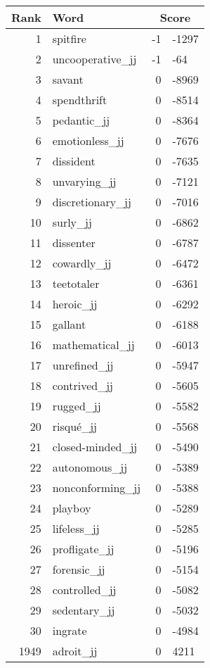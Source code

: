 \begin{longtable}[!htbp]{| rlr@{.}l |}
    \hline
    \textbf{Rank} & \textbf{Word} & \multicolumn{2}{c|}{\textbf{Score}} \\
    \hline
    \endhead
    1 & spitfire & -1 & -1297 \\
    2 & uncooperative\_jj & -1 & -64 \\
    3 & savant & 0 & -8969 \\
    4 & spendthrift & 0 & -8514 \\
    5 & pedantic\_jj & 0 & -8364 \\
    6 & emotionless\_jj & 0 & -7676 \\
    7 & dissident & 0 & -7635 \\
    8 & unvarying\_jj & 0 & -7121 \\
    9 & discretionary\_jj & 0 & -7016 \\
    10 & surly\_jj & 0 & -6862 \\
    11 & dissenter & 0 & -6787 \\
    12 & cowardly\_jj & 0 & -6472 \\
    13 & teetotaler & 0 & -6361 \\
    14 & heroic\_jj & 0 & -6292 \\
    15 & gallant & 0 & -6188 \\
    16 & mathematical\_jj & 0 & -6013 \\
    17 & unrefined\_jj & 0 & -5947 \\
    18 & contrived\_jj & 0 & -5605 \\
    19 & rugged\_jj & 0 & -5582 \\
    20 & risqué\_jj & 0 & -5568 \\
    21 & closed-minded\_jj & 0 & -5490 \\
    22 & autonomous\_jj & 0 & -5389 \\
    23 & nonconforming\_jj & 0 & -5388 \\
    24 & playboy & 0 & -5289 \\
    25 & lifeless\_jj & 0 & -5285 \\
    26 & profligate\_jj & 0 & -5196 \\
    27 & forensic\_jj & 0 & -5154 \\
    28 & controlled\_jj & 0 & -5082 \\
    29 & sedentary\_jj & 0 & -5032 \\
    30 & ingrate & 0 & -4984 \\
    1949 & adroit\_jj & 0 & 4211 \\

\end{longtable}
